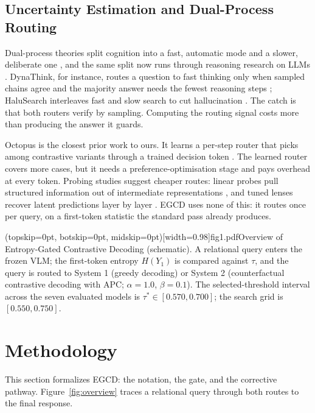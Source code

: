 \documentclass{ieeeaccess}
\begin{document}
\subsection{Uncertainty Estimation and Dual-Process Routing}\label{subsec:uncertainty}

Dual-process theories split cognition into a fast, automatic mode and a slower, deliberate one \cite{wason1974dual,kahneman2011thinking}, and the same split now runs through reasoning research on LLMs \cite{li2025system}. DynaThink, for instance, routes a question to fast thinking only when sampled chains agree and the majority answer needs the fewest reasoning steps \cite{pan2024dynathink}; HaluSearch interleaves fast and slow search to cut hallucination \cite{cheng2025think}. The catch is that both routers verify by sampling. Computing the routing signal costs more than producing the answer it guards.

Octopus is the closest prior work to ours. It learns a per-step router that picks among contrastive variants through a trained decision token \cite{suo2025octopus}. The learned router covers more cases, but it needs a preference-optimisation stage and pays overhead at every token. Probing studies suggest cheaper routes: linear probes pull structured information out of intermediate representations \cite{alain2016understanding}, and tuned lenses recover latent predictions layer by layer \cite{belrose2023eliciting}. EGCD uses none of this: it routes once per query, on a first-token statistic the standard pass already produces.

\Figure[!b](topskip=0pt, botskip=0pt, midskip=0pt)[width=0.98\textwidth]{fig1.pdf}{Overview of Entropy-Gated Contrastive Decoding (schematic). A relational query enters the frozen VLM; the first-token entropy $H(Y_{1})$ is compared against $\tau$, and the query is routed to System 1 (greedy decoding) or System 2 (counterfactual contrastive decoding with APC; $\alpha = 1.0$, $\beta = 0.1$). The selected-threshold interval across the seven evaluated models is $\tau^{*} \in [0.570, 0.700]$; the search grid is $[0.550, 0.750]$.\label{fig:overview}}

\section{Methodology}\label{sec:method}

This section formalizes EGCD: the notation, the gate, and the corrective pathway. Figure~\ref{fig:overview} traces a relational query through both routes to the final response.
\end{document}
